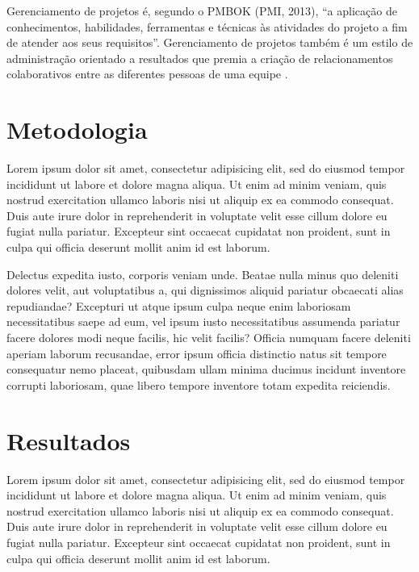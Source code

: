 \documentclass[
    12pt,               %
    openright,          %
    twoside,            %
    a4paper,            %
    chapter=TITLE,     %
    english,            %
    spanish,            %
    portuguese              %
    ]{abntex2}
\begin{document}
Gerenciamento de projetos é, segundo o PMBOK (PMI, 2013), \textquotedblleft{}a aplicação de conhecimentos, habilidades, ferramentas e técnicas às atividades do projeto a fim de atender aos seus requisitos\textquotedblright{}. Gerenciamento de projetos também é um estilo de administração orientado a resultados que premia a criação de relacionamentos colaborativos entre as diferentes pessoas de uma equipe \cite[p.~3]{grayLarson2009}.



\chapter{Metodologia}

Lorem ipsum dolor sit amet, consectetur adipisicing elit, sed do eiusmod tempor incididunt ut labore et dolore magna aliqua. Ut enim ad minim veniam, quis nostrud exercitation ullamco laboris nisi ut aliquip ex ea commodo consequat. Duis aute irure dolor in reprehenderit in voluptate velit esse cillum dolore eu fugiat nulla pariatur. Excepteur sint occaecat cupidatat non proident, sunt in culpa qui officia deserunt mollit anim id est laborum.


Delectus expedita iusto, corporis veniam unde. Beatae nulla minus quo deleniti dolores velit, aut voluptatibus a, qui dignissimos aliquid pariatur obcaecati alias repudiandae? Excepturi ut atque ipsum culpa neque enim laboriosam necessitatibus saepe ad eum, vel ipsum iusto necessitatibus assumenda pariatur facere dolores modi neque facilis, hic velit facilis? Officia numquam facere deleniti aperiam laborum recusandae, error ipsum officia distinctio natus sit tempore consequatur nemo placeat, quibusdam ullam minima ducimus incidunt inventore corrupti laboriosam, quae libero tempore inventore totam expedita reiciendis.



\chapter{Resultados}

Lorem ipsum dolor sit amet, consectetur adipisicing elit, sed do eiusmod tempor incididunt ut labore et dolore magna aliqua. Ut enim ad minim veniam, quis nostrud exercitation ullamco laboris nisi ut aliquip ex ea commodo consequat. Duis aute irure dolor in reprehenderit in voluptate velit esse cillum dolore eu fugiat nulla pariatur. Excepteur sint occaecat cupidatat non proident, sunt in culpa qui officia deserunt mollit anim id est laborum.
\end{document}
